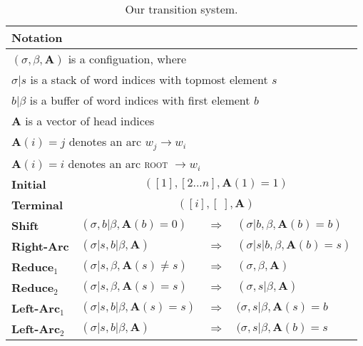 \documentclass[11pt,letterpaper]{article}
\begin{document}
\begin{table*}
    \begin{tabular}{|llll|}
    \hline
    \multicolumn{4}{|l|}{\textbf{Notation}}\\
    \hline
    \multicolumn{4}{|l|}{$(\sigma, \beta, \mathbf{A})$ is a configuation, where}\\
    \multicolumn{4}{|l|}{$\sigma | s$ is a stack of word indices with topmost element $s$} \\
    \multicolumn{4}{|l|}{$b | \beta$ is a buffer of word indices with first element $b$} \\
    \multicolumn{4}{|l|}{$\mathbf{A}$ is a vector of head indices} \\
    \multicolumn{4}{|l|}{$\mathbf{A}(i)=j $ denotes an arc $w_j \rightarrow w_i$}\\
    \multicolumn{4}{|l|}{$\mathbf{A}(i)=i $ denotes an arc \textsc{root} $\rightarrow w_i$} \\
        \hline
        \textbf{Initial} & \multicolumn{3}{c|}{$([ 1 ], [2 ... n], \mathbf{A}(1) = 1)$} \\
        \textbf{Terminal} & \multicolumn{3}{c|}{$([ i ], [ \; ], \mathbf{A})$} \\
        \hline
        \textbf{Shift} & $(\sigma, b | \beta, \mathbf{A}(b) = 0) $ & $\Rightarrow$ & $(\sigma | b, \beta, \mathbf{A}(b) = b) $ \\
        \textbf{Right-Arc}  & $(\sigma | s, b | \beta, \mathbf{A})$ & $\Rightarrow$ & $(\sigma | s | b, \beta, \mathbf{A}(b)=s) $ \\
        \textbf{Reduce}$_1$ & $(\sigma | s, \beta, \mathbf{A}(s) \neq s ) $ & $\Rightarrow$ & $(\sigma, \beta, \mathbf{A}) $ \\
        \textbf{Reduce}$_2$ & $(\sigma | s, \beta, \mathbf{A}(s) = s)$ & $\Rightarrow$ & $(\sigma, s | \beta, \mathbf{A} )$ \\
        \textbf{Left-Arc}$_1$ & $(\sigma | s, b | \beta, \textbf{A}(s)=s)$ & $\Rightarrow$ & $(\sigma, s | \beta, \mathbf{A}(s)=b $ \\
        \textbf{Left-Arc}$_2$ & $(\sigma | s, b | \beta, \textbf{A})$ & $\Rightarrow$ & $(\sigma, s | \beta,\mathbf{A}(b)=s $ \\
    \hline
    \end{tabular}
    \caption{Our transition system.\label{tab:trans}}
\end{table*}
\end{document}
